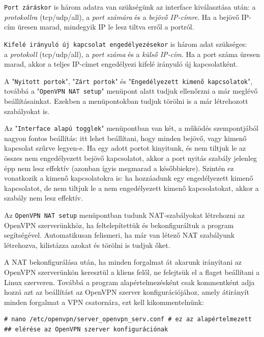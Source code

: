 \texttt{Port záráskor} is három adatra van szükségünk az interface kiválasztása után: a \textit{protokollra} (tcp/udp/all), a \textit{port számára} és a \textit{bejövő IP-címre}. Ha a bejövő IP-cím üresen marad, mindegyik IP le lesz tiltva erről a portról.

\texttt{Kifelé irányuló új kapcsolat engedélyezésekor} is három adat szükséges: \\a \textit{protokoll} (tcp/udp/all), a \textit{port száma} és a \textit{külső IP-cím}. Ha a port száma üresen marad, akkor a teljes IP-címet engedélyezi kifelé irányuló új kapcsolatként.

A "\texttt{Nyitott portok}", "\texttt{Zárt portok}" és "\texttt{Engedélyezett kimenő kapcsolatok}", továbbá a "\texttt{OpenVPN NAT setup}" menüpont alatt tudjuk ellenőrzni a már meglévő beállításainkat. Ezekben a menüpontokban tudjuk törölni is a már létrehozott szabályokat is.

Az "\texttt{Interface alapú togglek}" menüpontban van két, a működés szempontjából nagyon fontos beállítás: itt lehet beállítani, hogy minden bejövő, vagy kimenő kapcsolat szűrve legyen-e. Ha egy adott portot kinyitunk, és nem tiltjuk le az összes nem engedélyezett bejövő kapcsolatot, akkor a port nyitás szabály jelenleg épp nem lesz effektív (azonban ígyis megmarad a későbbiekre). Szintén ez vonatkozik a kimenő kapcsolatokra is: ha hozzáadunk egy engedélyezett kimenő kapcsolatot, de nem tiltjuk le a nem engedélyezett kimenő kapcsolatokat, akkor a szabály nem lesz effektív.

Az \texttt{OpenVPN NAT setup} menüpontban tudunk NAT-szabályokat létrehozni az\\ OpenVPN szerverünkhöz, ha feltelepítettük és bekonfiguráltuk a program segítségével. Automatikusan felismeri, ha már van létező NAT szabályunk létrehozva, kilistázza azokat és törölni is tudjuk őket. 


A NAT bekonfigurálása után, ha minden forgalmat át akarunk irányítani az\\ OpenVPN szerverünkön keresztül a kliens felől, ne felejtsük el a \textit{} flaget beállítani a Linux szerveren. Továbbá a program alapértelmezésként csak kommentként adja hozzá azt az beállítást az OpenVPN szerver konfigurációjához, amely átirányít minden forgalmat a VPN csatornára, ezt kell kikommentelnünk:

\begin{verbatim}
# nano /etc/openvpn/server_openvpn_serv.conf # ez az alapértelmezett
## elérése az OpenVPN szerver konfigurációnak
\end{verbatim}

